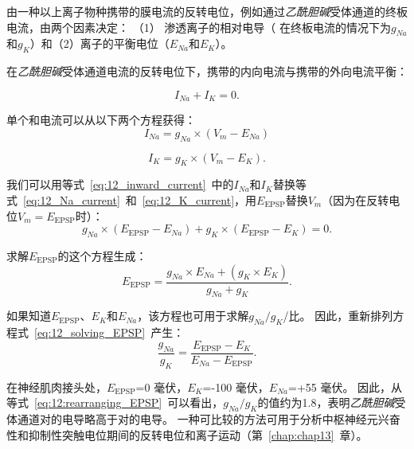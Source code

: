\begin{proposition}[终板电位的反转电位] \label{box:12_1}
	
	\quad \quad 由一种以上离子物种携带的膜电流的反转电位，例如通过\textit{乙酰胆碱}受体通道的终板电流，由两个因素决定：
	（1） 渗透离子的相对电导（ 在终板电流的情况下为$g_{Na}$和$g_K$）和（2）离子的平衡电位（$E_{Na}$和$E_K$）。
	
	\quad \quad 在\textit{乙酰胆碱}受体通道电流的反转电位下，携带的内向电流与携带的外向电流平衡：
	
	\begin{equation}\label{eq:12_inward_current}
		I_{Na} + I_K = 0.
	\end{equation}
	
	\quad \quad 单个和电流可以从以下两个方程获得：
	\begin{equation}\label{eq:12_Na_current}
		I_{Na} = g_{Na} \times (V_m - E_{Na})
	\end{equation}

	\begin{equation}\label{eq:12_K_current}
		I_K = g_K \times (V_m - E_K).
	\end{equation}
	
	\quad \quad 我们可以用等式~\ref{eq:12_inward_current}~中的$ I_{Na} $和$ I_K $替换等式~\ref{eq:12_Na_current}~和~\ref{eq:12_K_current}，用$E_{\text{EPSP}}$替换$V_m$（因为在反转电位$V_m = E_{\text{EPSP}}$时）：
	\begin{equation}\label{eq:12_substitude_inward_current}
		g_{Na} \times (E_{\text{EPSP}} - E_{Na}) + 
		g_K \times (E_{\text{EPSP}} - E_K)
		= 0.
	\end{equation}
	
	\quad \quad 求解$ E_{\text{EPSP}} $的这个方程生成：
	\begin{equation}\label{eq:12_solving_EPSP}
		E_{\text{EPSP}} = 
			\frac{
				g_{Na} \times E_{Na} + (g_K \times E_K)
			}
			{
				g_{Na} + g_K
			}.
	\end{equation}
	
	\quad \quad 如果知道$E_{\text{EPSP}}$、$E_K$和$E_{Na}$，该方程也可用于求解$g_{Na} / g_K$/比。
	因此，重新排列方程式~\ref{eq:12_solving_EPSP}~产生：
	\begin{equation}\label{eq:12:rearranging_EPSP}
		\frac{g_{Na}}{g_K} = 
		\frac{E_{\text{EPSP}} - E_{K}}{E_{Na} - E_{\text{EPSP}}}.
	\end{equation}
	
	\quad \quad 在神经肌肉接头处，$E_{\text{EPSP}}$=0 毫伏，$E_K$=-100 毫伏，$E_{Na}$=+55 毫伏。
	因此，从等式~\ref{eq:12:rearranging_EPSP}~可以看出，$g_{Na} / g_K$的值约为1.8，表明\textit{乙酰胆碱}受体通道对的电导略高于对的电导。
	一种可比较的方法可用于分析中枢神经元兴奋性和抑制性突触电位期间的反转电位和离子运动（第~\ref{chap:chap13}~章）。
	
\end{proposition}



